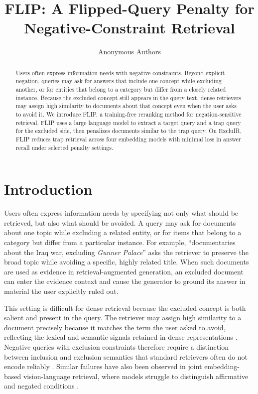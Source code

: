 \documentclass[11pt]{article}
\title{FLIP: A Flipped-Query Penalty for Negative-Constraint Retrieval}
\author{Anonymous Authors}
\newcommand{\method}{FLIP\xspace}
\begin{document}
\maketitle

\begin{abstract}
Users often express information needs with negative constraints.
Beyond explicit negation, queries may ask for answers that include one concept while excluding another, or for entities that belong to a category but differ from a closely related instance.
Because the excluded concept still appears in the query text, dense retrievers may assign high similarity to documents about that concept even when the user asks to avoid it.
We introduce \method, a training-free reranking method for negation-sensitive retrieval.
\method uses a large language model to extract a target query and a trap query for the excluded side, then penalizes documents similar to the trap query.
On ExcluIR, \method reduces trap retrieval across four embedding models with minimal loss in answer recall under selected penalty settings.
\end{abstract}

\section{Introduction}

Users often express information needs by specifying not only what should be retrieved, but also what should be avoided.
A query may ask for documents about one topic while excluding a related entity, or for items that belong to a category but differ from a particular instance.
For example, ``documentaries about the Iraq war, excluding \textit{Gunner Palace}'' asks the retriever to preserve the broad topic while avoiding a specific, highly related title.
When such documents are used as evidence in retrieval-augmented generation, an excluded document can enter the evidence context and cause the generator to ground its answer in material the user explicitly ruled out.

This setting is difficult for dense retrieval because the excluded concept is both salient and present in the query.
The retriever may assign high similarity to a document precisely because it matches the term the user asked to avoid, reflecting the lexical and semantic signals retained in dense representations \citep{ram-etal-2023-token}.
Negative queries with exclusion constraints therefore require a distinction between inclusion and exclusion semantics that standard retrievers often do not encode reliably \citep{lee2026deotrainingfreedirectembedding}.
Similar failures have also been observed in joint embedding-based vision-language retrieval, where models struggle to distinguish affirmative and negated conditions \citep{alhamoud2025visionlanguagemodelsunderstandnegation}.
\end{document}
